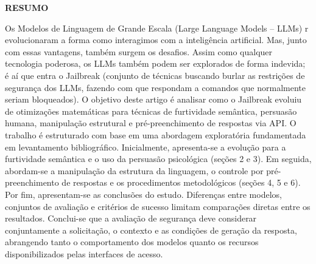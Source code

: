 \bigskip
\raggedright
\textbf{\MakeUppercase{Resumo}}

Os Modelos de Linguagem de Grande Escala (Large Language Models – LLMs) r
evolucionaram a forma como interagimos com a inteligência artificial. Mas, 
junto com essas vantagens, também surgem os desafios. Assim como qualquer 
tecnologia poderosa, os LLMs também podem ser explorados de forma indevida; 
é aí que entra o Jailbreak (conjunto de técnicas buscando burlar as restrições 
de segurança dos LLMs, fazendo com que respondam a comandos que normalmente 
seriam bloqueados). O objetivo deste artigo é analisar como o Jailbreak evoluiu 
de otimizações matemáticas para técnicas de furtividade semântica, persuasão 
humana, manipulação estrutural e pré-preenchimento de respostas via API. 
O trabalho é estruturado com base em uma abordagem exploratória fundamentada 
em levantamento bibliográfico. Inicialmente, apresenta-se a evolução para a 
furtividade semântica e o uso da persuasão psicológica (seções 2 e 3). Em seguida, 
abordam-se a manipulação da estrutura da linguagem, o controle por 
pré-preenchimento de respostas e os procedimentos metodológicos 
(seções 4, 5 e 6). Por fim, apresentam-se as conclusões do estudo. 
Diferenças entre modelos, conjuntos de avaliação e critérios de sucesso 
limitam comparações diretas entre os resultados. Conclui-se que a avaliação 
de segurança deve considerar conjuntamente a solicitação, o contexto e as 
condições de geração da resposta, abrangendo tanto o comportamento dos modelos 
quanto os recursos disponibilizados pelas interfaces de acesso.

